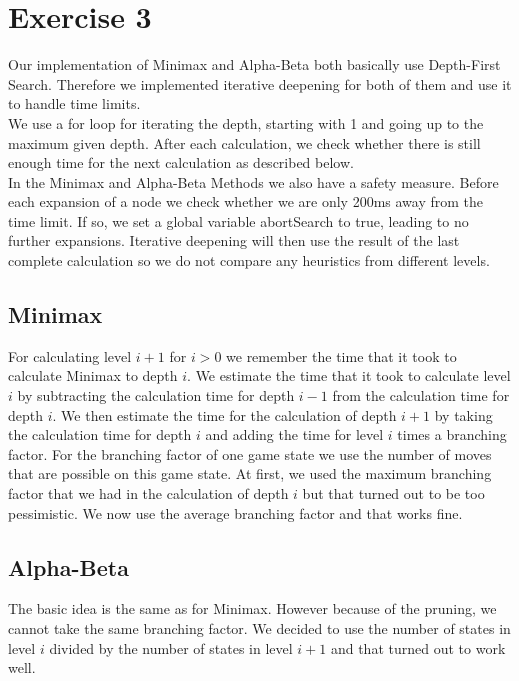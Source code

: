 \section{Exercise 3}
Our implementation of Minimax and Alpha-Beta both basically use Depth-First Search. Therefore we implemented iterative deepening for both of them and use it to handle time limits.\\
We use a for loop for iterating the depth, starting with 1 and going up to the maximum given depth. After each calculation, we check whether there is still enough time for the next calculation as described below.\\
In the Minimax and Alpha-Beta Methods we also have a safety measure. Before each expansion of a node we check whether we are only 200ms away from the time limit. If so, we set a global variable abortSearch to true, leading to no further expansions. Iterative deepening will then use the result of the last complete calculation so we do not compare any heuristics from different levels.
\subsection{Minimax}
For calculating level $i+1$ for $i > 0$ we remember the time that it took to calculate Minimax to depth $i$. We estimate the time that it took to calculate level $i$ by subtracting the calculation time for depth $i-1$ from the calculation time for depth $i$. We then estimate the time for the calculation of depth $i+1$ by taking the calculation time for depth $i$ and adding the time for level $i$ times a branching factor. For the branching factor of one game state we use the number of moves that are possible on this game state. At first, we used the maximum branching factor that we had in the calculation of depth $i$ but that turned out to be too pessimistic. We now use the average branching factor and that works fine.

\subsection{Alpha-Beta}
The basic idea is the same as for Minimax. However because of the pruning, we cannot take the same branching factor. We decided to use the number of states in level $i$ divided by the number of states in level $i+1$ and that turned out to work well.
